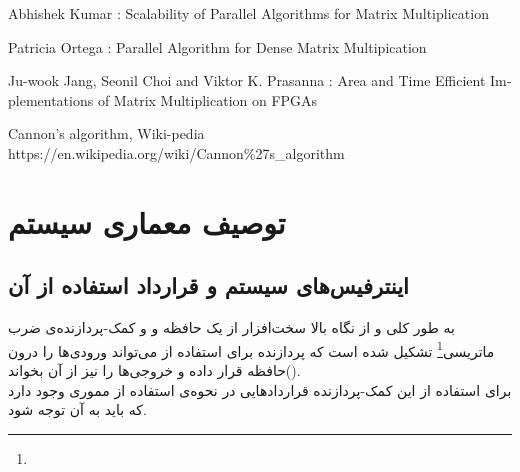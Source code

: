 \documentclass[12pt,onecolumn,a4paper,fleqn]{article}
\begin{document}
\begin{latin}
\begin{thebibliography}{}
	
	Abhishek Kumar : Scalability of Parallel Algorithms for Matrix Multiplication
	
	Patricia Ortega : Parallel Algorithm for Dense Matrix Multipication
	
	Ju-wook Jang, Seonil Choi and Viktor K. Prasanna : Area and Time Efficient Implementations of Matrix Multiplication on FPGAs
	
	Cannon's algorithm, Wiki-pedia\\ https://en.wikipedia.org/wiki/Cannon\%27s\_algorithm
	
	
\end{thebibliography}
\end{latin}

\pagebreak

\section{توصیف معماری سیستم}
\subsection{اینترفیس‌های سیستم و قرارداد استفاده از آن }
به طور کلی  و از نگاه بالا سخت‌افزار از یک حافظه و و کمک-پردازنده‌ی ضرب ماتریسی\footnote{} تشکیل شده است که پردازنده برای استفاده از‌ می‌تواند ورودی‌ها را درون حافظه قرار داده و خروجی‌ها را نیز از آن بخواند(). 
\\ برای استفاده از این  کمک-پردازنده قرارداد‌هایی در نحوه‌ی استفاده از مموری وجود دارد که باید به آن توجه شود.
\end{document}
